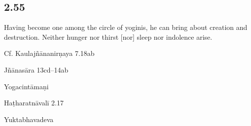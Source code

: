 \begin{ekdosis}
\begin{philcomm}[hp02_054]
\end{philcomm}

\subsection*{2.55}
\begin{translation}[hp02_055]
Having become one among the circle of yoginis, he can bring about creation and destruction. Neither hunger nor thirst [nor] sleep nor indolence arise.
\end{translation}

\begin{sources}[hp02_055]
Cf. Kaulajñānanirṇaya 7.18ab

\begin{versinnote}
\end{versinnote}

Jñānasāra 13cd–14ab

\begin{versinnote}
\end{versinnote}
\end{sources}

\begin{testimonia}[hp02_055]
Yogacintāmaṇi

\begin{versinnote}
\end{versinnote}

Haṭharatnāvalī 2.17

\begin{versinnote}
\end{versinnote}

Yuktabhavadeva

\begin{versinnote}
\end{versinnote}
\end{testimonia}


\end{ekdosis}
